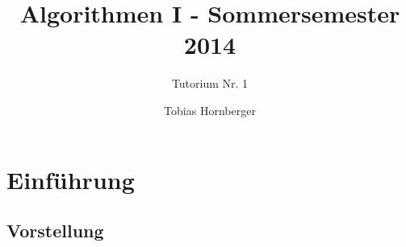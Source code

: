 \documentclass[18pt]{beamer}
\title[Algo Tutorium Nr.1]{Algorithmen I - Sommersemester 2014}
\subtitle{Tutorium Nr. 1}
\author{Tobias Hornberger}
\institute{Institut für Theoretische Informatik}
\begin{document}

\begin{frame}
\titlepage
\end{frame}


\section{Einführung}
	\subsection{Vorstellung}
\end{document}
